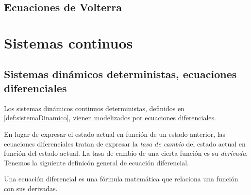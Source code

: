 \subsection{Ecuaciones de Volterra}


\section{Sistemas continuos}

\subsection{Sistemas dinámicos deterministas, ecuaciones diferenciales}

Los sistemas dinámicos continuos deterministas, definidos en \ref{def:sistemaDinamico}, vienen modelizados por ecuaciones diferenciales.

En lugar de expresar el estado actual en función de un estado anterior, las ecuaciones diferenciales tratan de expresar la \emph{tasa de cambio} del estado actual en función del estado actual. La tasa de cambio de una cierta función es su \emph{derivada}. Tenemos la siguiente definicón general de ecuación diferencial.

\begin{definition}
Una ecuación diferencial es una fórmula matemática que relaciona una función con sus derivadas.
\end{definition}

